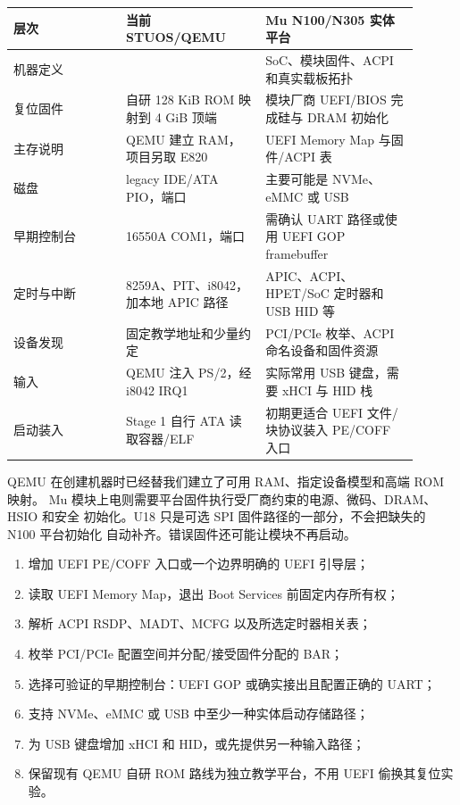 \begin{longtable}{L{0.25\linewidth}L{0.31\linewidth}L{0.34\linewidth}}
\toprule
层次 & 当前 STUOS/QEMU & Mu N100/N305 实体平台 \\
\midrule
机器定义 &  & SoC、模块固件、ACPI 和真实载板拓扑 \\
复位固件 & 自研 128 KiB ROM 映射到 4 GiB 顶端 & 模块厂商 UEFI/BIOS 完成硅与 DRAM 初始化 \\
主存说明 & QEMU 建立 RAM，项目另取  E820 & UEFI Memory Map 与固件/ACPI 表 \\
磁盘 & legacy IDE/ATA PIO，端口  & 主要可能是 NVMe、eMMC 或 USB \\
早期控制台 & 16550A COM1，端口  & 需确认 UART 路径或使用 UEFI GOP framebuffer \\
定时与中断 & 8259A、PIT、i8042，加本地 APIC 路径 & APIC、ACPI、HPET/SoC 定时器和 USB HID 等 \\
设备发现 & 固定教学地址和少量约定 & PCI/PCIe 枚举、ACPI 命名设备和固件资源 \\
输入 & QEMU 注入 PS/2，经 i8042 IRQ1 & 实际常用 USB 键盘，需要 xHCI 与 HID 栈 \\
启动装入 & Stage 1 自行 ATA 读取容器/ELF & 初期更适合 UEFI 文件/块协议装入 PE/COFF 入口 \\
\bottomrule
\end{longtable}

%
QEMU 在创建机器时已经替我们建立了可用 RAM、指定设备模型和高端 ROM 映射。
Mu 模块上电则需要平台固件执行受厂商约束的电源、微码、DRAM、HSIO 和安全
初始化。U18 只是可选 SPI 固件路径的一部分，不会把缺失的 N100 平台初始化
自动补齐。错误固件还可能让模块不再启动。

%

\begin{enumerate}[leftmargin=2em]
  \item 增加 UEFI PE/COFF 入口或一个边界明确的 UEFI 引导层；
  \item 读取 UEFI Memory Map，退出 Boot Services 前固定内存所有权；
  \item 解析 ACPI RSDP、MADT、MCFG 以及所选定时器相关表；
  \item 枚举 PCI/PCIe 配置空间并分配/接受固件分配的 BAR；
  \item 选择可验证的早期控制台：UEFI GOP 或确实接出且配置正确的 UART；
  \item 支持 NVMe、eMMC 或 USB 中至少一种实体启动存储路径；
  \item 为 USB 键盘增加 xHCI 和 HID，或先提供另一种输入路径；
  \item 保留现有 QEMU 自研 ROM 路线为独立教学平台，不用 UEFI 偷换其复位实验。
\end{enumerate}

